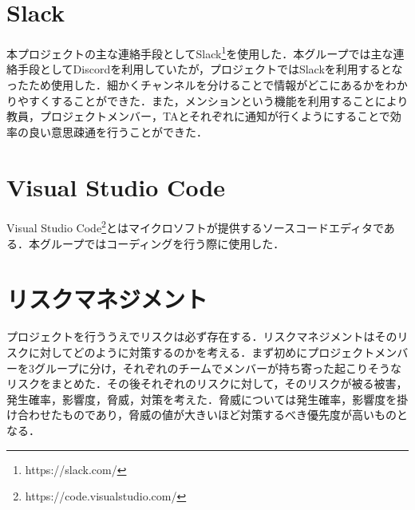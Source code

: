 \section{Slack}
本プロジェクトの主な連絡手段としてSlack\footnote{https://slack.com/}を使用した．本グループでは主な連絡手段としてDiscordを利用していたが，プロジェクトではSlackを利用するとなったため使用した．細かくチャンネルを分けることで情報がどこにあるかをわかりやすくすることができた．また，メンションという機能を利用することにより教員，プロジェクトメンバー，TAとそれぞれに通知が行くようにすることで効率の良い意思疎通を行うことができた．

\section{Visual Studio Code}
Visual Studio Code\footnote{https://code.visualstudio.com/}とはマイクロソフトが提供するソースコードエディタである．本グループではコーディングを行う際に使用した．




\pagebreak
\section{リスクマネジメント}
プロジェクトを行ううえでリスクは必ず存在する．リスクマネジメント\cite{risk}はそのリスクに対してどのように対策するのかを考える．まず初めにプロジェクトメンバーを3グループに分け，それぞれのチームでメンバーが持ち寄った起こりそうなリスクをまとめた．その後それぞれのリスクに対して，そのリスクが被る被害，発生確率，影響度，脅威，対策を考えた．脅威については発生確率，影響度を掛け合わせたものであり，脅威の値が大きいほど対策するべき優先度が高いものとなる．

